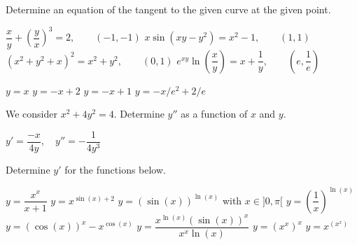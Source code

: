 
\begin{Exercise} Determine an equation of the tangent to the given curve at the given point. 
	\begin{multicols}{2}
	\ifanalysis\Question[difficulty = 1]\fi\ifcalculus\Question[difficulty = 2]\fi $\dfrac{x}{y} + \left( \dfrac{y}{x} \right)^3 = 2, \qquad (-1, -1)$
	\ifanalysis\Question[difficulty = 1]\fi\ifcalculus\Question[difficulty = 2]\fi $x \sin (xy-y^2) = x^2 - 1, \qquad (1,1)$
	\Question[difficulty = 1] $ \left(x^2+y^2+x \right)^2 = x^2 + y^2, \qquad (0,1)$
	\ifanalysis
	\Question[difficulty = 2] $e^{xy} \ln \left( \dfrac{x}{y} \right) = x + \dfrac{1}{y}, \qquad \left(e,\dfrac{1}{e} \right)$
	\fi
	\EndCurrentQuestion
	\end{multicols}

\end{Exercise}

\begin{Answer}\phantom{}
    \begin{multicols}{2}
	
	\Question $y=x$
	\Question $y=-x+2$
	\Question $ y=-x+1$ 
	\ifanalysis
	\Question $y=-x/e^2+2/e$
	\fi
	\EndCurrentQuestion
	\end{multicols}
\end{Answer}
	
\begin{Exercise}[difficulty = 1] We consider $x^2 + 4y^2 = 4$. Determine $y''$ as a function of $x$ and $y$. 

\end{Exercise}

\begin{Answer}\phantom{}
    $y' = \dfrac{-x}{4y}, \quad y''= -\dfrac{1}{4y^3}$ 
\end{Answer}

\begin{Exercise} Determine $y'$ for the functions below.
	\begin{multicols}{2}
    	\Question[difficulty = 1] $ y = \dfrac{x^x}{x+1}$
    	\Question[difficulty = 1] $ y = x^{\sin(x)+2}$
    	\Question[difficulty = 1] $y = \left( \sin (x) \right)^{\ln (x)}$ \quad with $x \in ]0,\pi[$
    	\Question[difficulty = 1] $y = \left(\dfrac{1}{x}\right)^{\ln (x)}$
    	\Question[difficulty = 2] $y = (\cos (x))^x - x^{\cos (x)}$ 
    	\Question[difficulty = 2] $y = \dfrac{x^{\ln (x)}(\sin (x))^x}{x^x \ln (x)}$ 
    	\ifanalysis
		\Question[difficulty = 2] $y = (x^x)^x$
        \Question[difficulty = 2] $y = x^{(x^x)}$
        \fi
    	\EndCurrentQuestion
	\end{multicols}
	
\end{Exercise}

